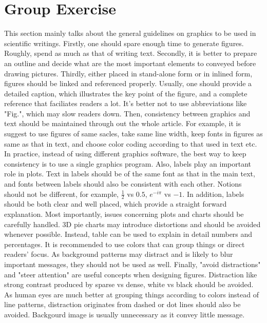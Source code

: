 \documentclass[paper=a4, fontsize=11pt]{scrartcl} %
\numberwithin{equation}{section} %
\numberwithin{figure}{section} %
\numberwithin{table}{section} %
\begin{document}
\section{Group Exercise}
	This section mainly talks about the general guidelines on graphics to be used in scientific writings. \newline
	Firstly, one should spare enough time to generate figures. Roughly, spend as much as that of writing text.\newline 
	Secondly, it is better to prepare an outline and decide what are the most important elements to conveyed before drawing pictures.\newline 
	Thirdly, either placed in stand-alone form or in inlined form, figures should be linked and referenced properly. Usually, one should provide a detailed caption, which illustrates the key point of the figure, and a complete reference that faciliates readers a lot. It's better not to use abbreviations like "Fig.", which may slow readers down. \newline
	Then, consistency between graphics and text should be maintained through out the whole article. For example, it is suggest to use figures of same sacles, take same line width, keep fonts in figures as same as that in text, and choose color coding according to that used in text etc. In practice, instead of using different graphics software, the best way to keep consistency is to use a single graphics program. \newline
	Also, labels play an important role in plots. Text in labels should be of the same font as that in the main text, and fonts between labels should also be consistent with each other. Notions should not be different, for example, $\frac{1}{2}$ vs $0.5$, $e^{-i\pi}$ vs $-1$. In addition, labels should be both clear and well placed, which provide a straight forward explanation.\newline
	Most importantly, issues concerning plots and charts should be carefully handled. 3D pie charts may introduce distortions and should be avoided whenever possible. Instead, table can be used to explain in detail numbers and percentages. It is recommended to use colors that can group things or direct readers' focus. As background patterns may distract and is likely to blur important messages, they should not be used as well. \newline
	Finally, "avoid distractions" and "steer attention" are useful concepts when designing figures. Distraction like strong contrast produced by sparse vs dense, white vs black should be avoided. As human eyes are much better at grouping things according to colors instead of line patterns, distraction originates from dashed or dot lines should also be avoided. Backgourd image is usually unnecessary as it convey little message.  
	
\end{document}
